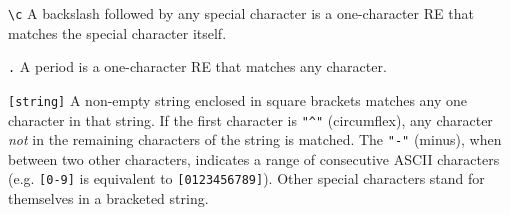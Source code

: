 \texttt{{\textbackslash}c} A backslash followed by any special character
is a one-character RE that matches the special character itself. %

\texttt{.} A period is a one-character RE that matches any character.

\texttt{[string]} A non-empty string enclosed in square brackets
matches any one character in that string. If the
first character is \texttt{"\^{}"}
(circumflex), any character {\em not\/} in the remaining
characters of the string is matched. The \texttt{"-"}
(minus), when between two other characters, indicates a
range of consecutive ASCII characters (e.g. \texttt{[0-9]}
is equivalent to \texttt{[0123456789]}). Other special characters stand
for themselves in a bracketed string.

